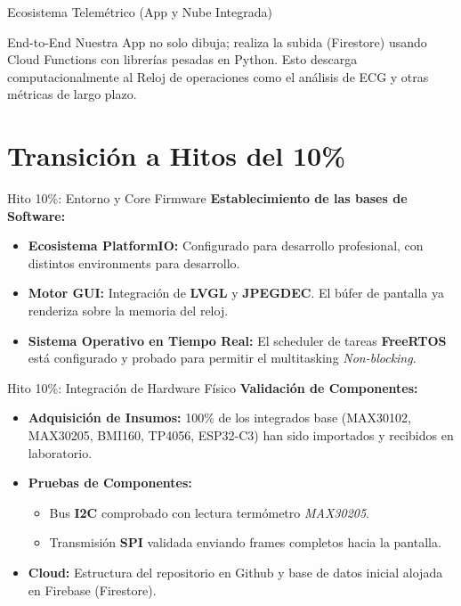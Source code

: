 \documentclass[aspectratio=169, 10pt]{beamer}
\begin{document}
\begin{frame}{Ecosistema Telemétrico (App y Nube Integrada)}
    \begin{block}{End-to-End}
        Nuestra App no solo dibuja; realiza la subida (Firestore) usando Cloud Functions con librerías pesadas en Python. Esto descarga computacionalmente al Reloj de operaciones como el análisis de ECG y otras métricas de largo plazo.
    \end{block}
    \begin{center}
        \resizebox{0.95\linewidth}{!}{}
    \end{center}
\end{frame}

\section{Transición a Hitos del 10\%}

\begin{frame}{Hito 10\%: Entorno y Core Firmware}
    \textbf{Establecimiento de las bases de Software:}
    \vspace{0.2cm}
    \begin{itemize}
        \item \textbf{Ecosistema PlatformIO:} Configurado para desarrollo profesional, con distintos environments para desarrollo.
        \item \textbf{Motor GUI:} Integración de \textbf{LVGL} y \textbf{JPEGDEC}. El búfer de pantalla ya renderiza sobre la memoria del reloj.
        \item \textbf{Sistema Operativo en Tiempo Real:} El scheduler de tareas \textbf{FreeRTOS} está configurado y probado para permitir el multitasking \textit{Non-blocking}.
    \end{itemize}
\end{frame}

\begin{frame}{Hito 10\%: Integración de Hardware Físico}
    \textbf{Validación de Componentes:}
    \vspace{0.2cm}
    \begin{itemize}
        \item \textbf{Adquisición de Insumos:} 100\% de los integrados base (MAX30102, MAX30205, BMI160, TP4056, ESP32-C3) han sido importados y recibidos en laboratorio.
        \item \textbf{Pruebas de Componentes:} 
        \begin{itemize}
            \item Bus \textbf{I2C} comprobado con lectura termómetro \textit{MAX30205}.
            \item Transmisión \textbf{SPI} validada enviando frames completos hacia la pantalla.
        \end{itemize}
        \item \textbf{Cloud:} Estructura del repositorio en Github y base de datos inicial alojada en Firebase (Firestore).
    \end{itemize}
\end{frame}
\end{document}

